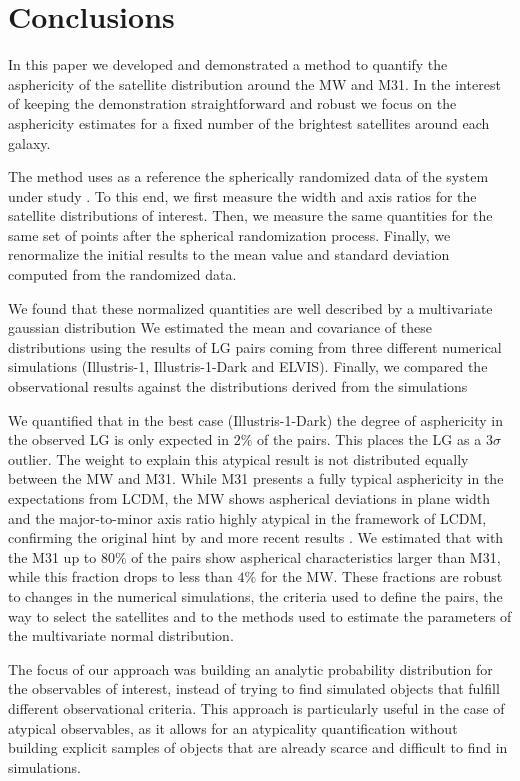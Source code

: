 \documentclass[a4paper,fleqn,usenatbib]{mnras}
\begin{document}
\section{Conclusions}\label{sec:conclusions}

In this paper we developed and demonstrated a method to quantify the
asphericity of the satellite distribution around the MW and M31.  
In the interest of keeping the demonstration straightforward and robust we
focus on the asphericity estimates for a fixed number of the brightest
satellites around each galaxy. 

The method uses as a reference the spherically randomized data
of the system under study \citep{2017AN....338..854P}.  
To this end, we first measure the width and axis ratios for the satellite
distributions of interest. 
Then, we measure the same quantities for the same set of points after
the spherical randomization process.
Finally, we renormalize the initial results to the mean value and
standard deviation computed from the randomized data.  

We found that these normalized quantities are well described by
a multivariate gaussian distribution 
We estimated the mean and covariance of these distributions using
the results of LG pairs coming from three different numerical
simulations (Illustris-1, Illustris-1-Dark and ELVIS). 
Finally, we compared the observational results against the
distributions derived from the simulations

We quantified that in the best case (Illustris-1-Dark) the degree of
asphericity in the observed LG is only expected in $2\%$ of the
pairs. 
This places the LG as a $3\sigma$ outlier.   
The weight to explain this atypical result is not distributed equally
between the MW and M31. 
While M31 presents a fully typical asphericity in the expectations
from LCDM, the MW shows aspherical deviations in plane width and the
major-to-minor axis ratio highly atypical in the framework of LCDM,
confirming the original hint by \cite{2005A&A...431..517K} and more
recent results \citep{2012MNRAS.423.1109P,2015ApJ...815...19P}. 
We estimated that with the M31 up to $80\%$ of the pairs
show aspherical characteristics larger than M31, while this fraction
drops to less than $4\%$ for the MW.  
These fractions are robust to changes in the numerical simulations,
the criteria used to define the pairs, the way to select the
satellites and to the methods used to estimate the parameters of the
multivariate normal distribution.


The focus of our approach was building an analytic probability
distribution for the observables of interest, instead of trying to
find simulated objects that fulfill different observational criteria. 
This approach is particularly useful in the case of atypical
observables, as it allows for an atypicality quantification without
building explicit samples of objects that are already scarce and
difficult to find in simulations.  
\end{document}
